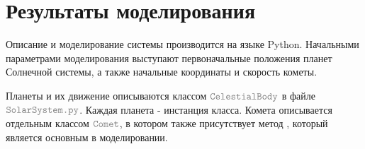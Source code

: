 \section{Результаты моделирования}
Описание и моделирование системы производится на языке Python.
Начальными параметрами моделирования выступают первоначальные положения планет Солнечной системы,
а также начальные координаты и скорость кометы.

Планеты и их движение описываются классом $\codeword{CelestialBody}$ в файле $\codeword{SolarSystem.py}$.
Каждая планета - инстанция класса. Комета описывается отдельным классом $\codeword{Comet}$, в котором также 
присутствует метод , который является основным в моделировании.



